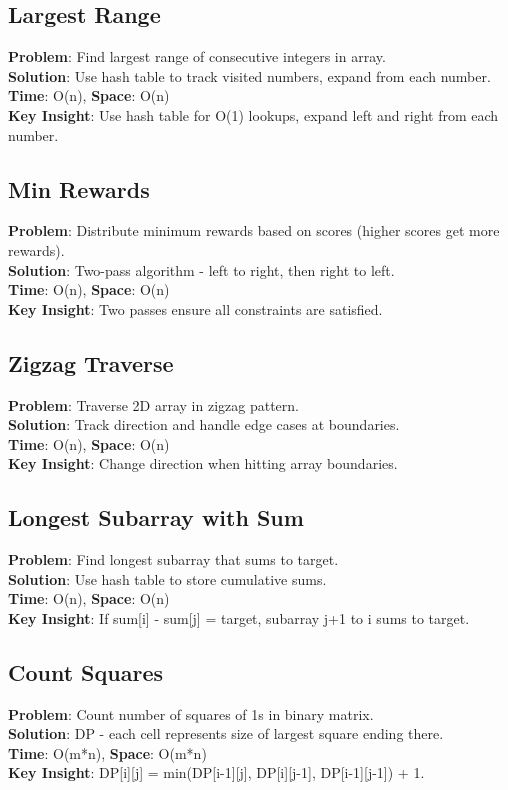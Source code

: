 \documentclass{report}
\begin{document}
\subsection{Largest Range}
\textbf{Problem}: Find largest range of consecutive integers in array.\\
\textbf{Solution}: Use hash table to track visited numbers, expand from each number.\\
\textbf{Time}: O(n), \textbf{Space}: O(n)\\
\textbf{Key Insight}: Use hash table for O(1) lookups, expand left and right from each number.

\subsection{Min Rewards}
\textbf{Problem}: Distribute minimum rewards based on scores (higher scores get more rewards).\\
\textbf{Solution}: Two-pass algorithm - left to right, then right to left.\\
\textbf{Time}: O(n), \textbf{Space}: O(n)\\
\textbf{Key Insight}: Two passes ensure all constraints are satisfied.

\subsection{Zigzag Traverse}
\textbf{Problem}: Traverse 2D array in zigzag pattern.\\
\textbf{Solution}: Track direction and handle edge cases at boundaries.\\
\textbf{Time}: O(n), \textbf{Space}: O(n)\\
\textbf{Key Insight}: Change direction when hitting array boundaries.

\subsection{Longest Subarray with Sum}
\textbf{Problem}: Find longest subarray that sums to target.\\
\textbf{Solution}: Use hash table to store cumulative sums.\\
\textbf{Time}: O(n), \textbf{Space}: O(n)\\
\textbf{Key Insight}: If sum[i] - sum[j] = target, subarray j+1 to i sums to target.

\subsection{Count Squares}
\textbf{Problem}: Count number of squares of 1s in binary matrix.\\
\textbf{Solution}: DP - each cell represents size of largest square ending there.\\
\textbf{Time}: O(m*n), \textbf{Space}: O(m*n)\\
\textbf{Key Insight}: DP[i][j] = min(DP[i-1][j], DP[i][j-1], DP[i-1][j-1]) + 1.
\end{document}
